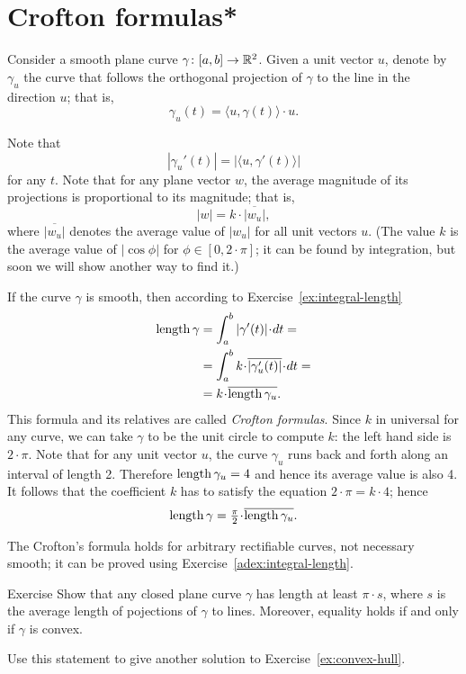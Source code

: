 \section{Crofton formulas*}\label{page:crofton}

Consider a smooth plane curve $\gamma\colon[a,b]\to\mathbb{R}^2$.
Given a unit vector $u$, denote by $\gamma_u$ the curve that follows the orthogonal projection of $\gamma$ to the line in the direction $u$;
that is, 
\[\gamma_u(t)=\langle u,\gamma(t)\rangle\cdot u.\]

Note that 
\[|\gamma_u'(t)|=|\langle u,\gamma'(t)\rangle|\] for any $t$.
Note that for any plane vector $w$, the average magnitude of its projections is proportional to its magnitude; that is,
\[|w|=k\cdot \overline{|w_u|},\]
where $\overline{|w_u|}$ denotes the average value of $|w_u|$ for all unit vectors $u$.
(The value $k$ is the average value of $|\cos\phi|$ for $\phi\in [0,2\cdot\pi]$; it can be found by integration, but soon we will show another way to find it.)

If the curve $\gamma$ is smooth, then according to Exercise~\ref{ex:integral-length}
\begin{align*}
\length\gamma
&=\int_a^b|\gamma'(t)|\cdot dt=
\\
&=\int_a^b  k\cdot \overline{|\gamma_u'(t)|}\cdot dt=
\\
&=k\cdot \overline{\length\gamma_u}.
\end{align*}
This formula and its relatives are called \emph{Crofton formulas}.
Since $k$ in universal for any curve, we can take $\gamma$ to be the unit circle to compute $k$: the left hand side is $2\cdot\pi$.
Note that for any unit vector $u$, the curve $\gamma_u$ runs back and forth along an interval of length 2.
Therefore $\mathop{\rm length}\nolimits\gamma_u=4$ and hence its average value is also 4.
It follows that the coefficient $k$ has to satisfy the equation $2\cdot \pi =k\cdot 4$; hence 
\[
\length\gamma
=\tfrac\pi2\cdot \overline{\length\gamma_u}.
\]

The Crofton's formula holds for arbitrary rectifiable curves, not necessary smooth; it can be proved using Exercise~\ref{adex:integral-length}.

\begin{thm}{Exercise}\label{ex:convex-croftons}
Show that any closed plane curve $\gamma$ has length at least $\pi\cdot s$, where $s$ is the average length of pojections of $\gamma$ to lines.
Moreover, equality holds if and only if $\gamma$ is convex.

Use this statement to give another solution to Exercise~\ref{ex:convex-hull}.
\end{thm}

